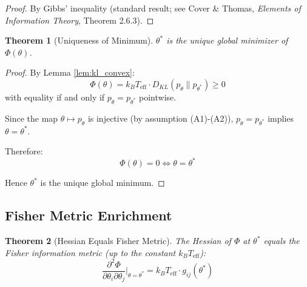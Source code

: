 \documentclass[11pt]{article}
\newtheorem{theorem}{Theorem}
\begin{document}
\begin{proof}
By Gibbs' inequality (standard result; see Cover \& Thomas, \emph{Elements of Information Theory}, Theorem 2.6.3).
\end{proof}

\begin{theorem}[Uniqueness of Minimum]
\label{thm:uniqueness}
$\theta^*$ is the unique global minimizer of $\Phi(\theta)$.
\end{theorem}

\begin{proof}
By Lemma \ref{lem:kl_convex}:
\begin{equation}
\Phi(\theta) = k_B T_{\text{eff}} \cdot D_{KL}(p_\theta \| p_{\theta^*}) \geq 0
\end{equation}
with equality if and only if $p_\theta = p_{\theta^*}$ pointwise.

Since the map $\theta \mapsto p_\theta$ is injective (by assumption (A1)-(A2)), $p_\theta = p_{\theta^*}$ implies $\theta = \theta^*$.

Therefore:
\begin{equation}
\Phi(\theta) = 0 \iff \theta = \theta^*
\end{equation}

Hence $\theta^*$ is the unique global minimum.
\end{proof}

\subsection{Fisher Metric Enrichment}

\begin{theorem}[Hessian Equals Fisher Metric]
\label{thm:fisher_hessian}
The Hessian of $\Phi$ at $\theta^*$ equals the Fisher information metric (up to the constant $k_B T_{\text{eff}}$):
\begin{equation}
\frac{\partial^2 \Phi}{\partial \theta_i \partial \theta_j} \bigg|_{\theta = \theta^*} = k_B T_{\text{eff}} \cdot g_{ij}(\theta^*)
\end{equation}
\end{theorem}
\end{document}
